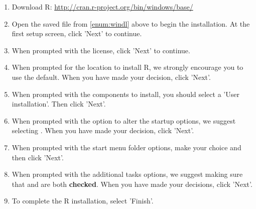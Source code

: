 \begin{enumerate}
  \item Download R: \url{http://cran.r-project.org/bin/windows/base/} \label{enum:windl}
  \item Open the saved file from \ref{enum:windl} above to begin the installation.  At the first setup screen, click 'Next' to continue.
  \item When prompted with the license, click 'Next' to continue.
  \item When prompted for the location to install R, we strongly encourage you to use the default.  When you have made your decision, click 'Next'.
  \item When prompted with the components to install, you should select a 'User installation'.  Then click 'Next'.
  \item When prompted with the option to alter the startup options, we suggest selecting .  When you have made your decision, click 'Next'.
  \item When prompted with the start menu folder options, make your choice and then click 'Next'.
  \item When prompted with the additional tasks options, we suggest making sure that  and  are both \textbf{checked}.  When you have made your decisions, click 'Next'.
  \item To complete the R installation, select 'Finish'.
\end{enumerate}

